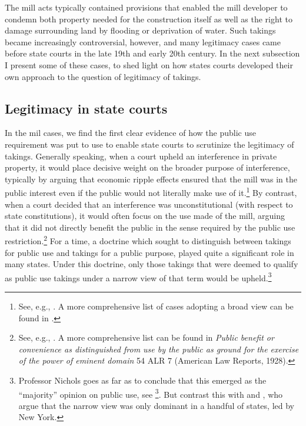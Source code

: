 \documentclass[12pt,a4paper]{book} %
\begin{document}
The mill acts typically contained provisions that enabled the mill developer to condemn both property needed for the construction itself as well as the right to damage surrounding land by flooding or deprivation of water. Such takings became increasingly controversial, however, and many legitimacy cases came before state courts in the late 19th and early 20th century. In the next subsection I present some of these cases, to shed light on how states courts developed their own approach to the question of legitimacy of takings.

\subsection{Legitimacy in state courts}\label{subsec:state}

In the mil cases, we find the first clear evidence of how the public use requirement was put to use to enable state courts to scrutinize the legitimacy of takings. Generally speaking, when a court upheld an interference in private property, it would place decisive weight on the broader purpose of interference, typically by arguing that economic ripple effects ensured that the mill was in the public interest even if the public would not literally make use of it.\footnote{See, e.g., \cite{hazen53,scudder32,boston32}. A more comprehensive list of cases adopting a broad view can be found in \cite[617]{nichols40}.} By contrast, when a court decided that an interference was unconstitutional (with respect to state constitutions), it would often focus on the use made of the mill, arguing that it did not directly benefit the public in the sense required by the public use restriction.\footnote{See, e.g., \cite{sadler59,ryerson77,gaylord03,minn06}. A more comprehensive list can be found in {\it Public benefit or convenience as distinguished from use by the public as ground for the exercise of the power of eminent domain} 54 ALR 7 (American Law Reports, 1928).} For a time, a doctrine which sought to distinguish between takings for public use and takings for a public purpose, played quite a significant role in many states. Under this doctrine, only those takings that were deemed to qualify as public use takings under a narrow view of that term would be upheld.\footnote{Professor Nichols goes as far as to conclude that this emerged as the ``majority'' opinion on public use, see \footcite[617-618]{nichols40}. But contrast this with \cite{berger78} and \cite[24]{meidinger80}, who argue that the narrow view was only dominant in a handful of states, led by New York.}
\end{document}
